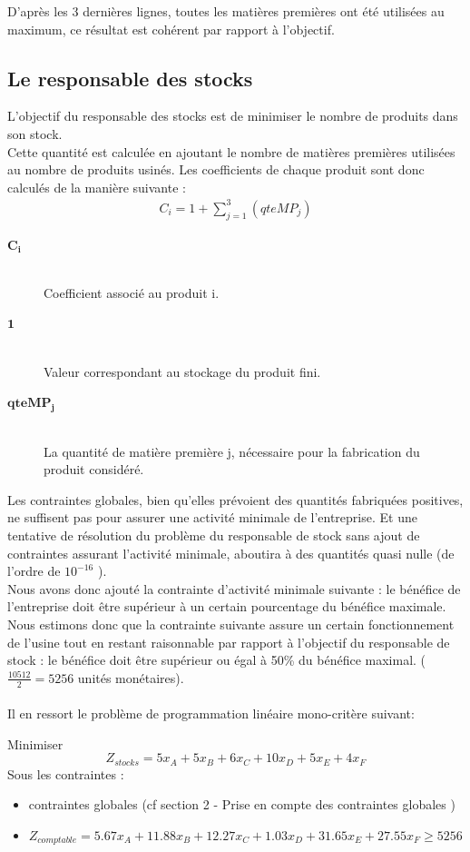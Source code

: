 \documentclass[12pt]{article}
\begin{document}
D'après les 3 dernières lignes, toutes les matières premières ont été utilisées au maximum, ce résultat est cohérent par rapport à l'objectif.
\subsection{Le responsable des stocks}
L'objectif du responsable des stocks est de minimiser le nombre de produits dans son stock. \\
Cette quantité est calculée en ajoutant le nombre de matières premières utilisées au nombre de produits usinés. Les coefficients de chaque produit sont donc calculés de la manière suivante : 
\begin{align*} C_{i} = 1 +  \sum_{j=1}^{3}(qteMP_{j}) 
\end{align*}
\begin{description}
\item[$\mathbf{C_{i}}$]\hfill\\Coefficient associé au produit i.
\item[$\mathbf{1}$]\hfill\\ Valeur correspondant au stockage du produit fini.
\item[$\mathbf{qteMP_{j}}$]\hfill\\La quantité de matière première j, nécessaire pour la fabrication du produit considéré.
\end{description}
Les contraintes globales, bien qu'elles prévoient des quantités fabriquées positives, ne suffisent pas pour assurer une activité minimale de l'entreprise. Et une tentative de résolution du problème du responsable de stock sans ajout de contraintes assurant l'activité minimale, aboutira à des quantités quasi nulle (de l'ordre de $ 10 ^{-16}$ ).\\
Nous avons donc ajouté la contrainte d'activité minimale suivante : le bénéfice de l'entreprise doit être supérieur à un certain pourcentage du bénéfice maximale.\\
Nous estimons donc que la contrainte suivante assure un certain fonctionnement de l'usine tout en restant raisonnable par rapport à l'objectif du responsable de stock : le bénéfice doit être supérieur ou égal à 50\% du bénéfice maximal. ($\frac{10512}{2} = 5256$ unités monétaires).\\
\\
Il en ressort le problème de programmation linéaire mono-critère suivant:
\begin{tcolorbox}
Minimiser
\begin{equation*}
 Z_{stocks}= 5x_{A} + 5x_{B} + 6x_{C} + 10x_{D} + 5x_{E} + 4x_{F}
\end{equation*}
Sous les contraintes :
\begin{itemize}
\item contraintes globales (cf section 2 - Prise en compte des contraintes globales )
\item $Z_{comptable}= 5.67x_{A} +11.88x_{B} +12.27x_{C} +1.03x_{D} +31.65x_{E} +27.55x_{F} \geq 5256$
\end{itemize}
\end{tcolorbox}
\end{document}
